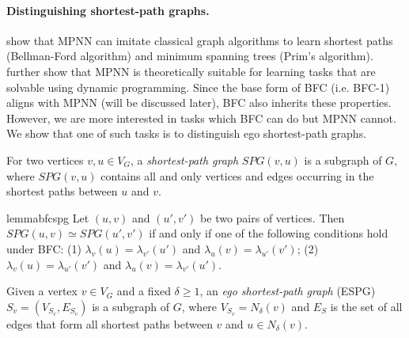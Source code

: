 
\paragraph{Distinguishing shortest-path graphs.} 
\citet{Velickovic_neuralexecutoin} show that MPNN can imitate classical graph algorithms to learn shortest paths (Bellman-Ford algorithm) and minimum spanning trees (Prim’s algorithm). \citet{xu20_gnnreasoning} further show that MPNN is theoretically suitable for learning tasks that are solvable using dynamic programming. Since the base form of BFC (i.e. BFC-1) aligns with MPNN (will be discussed later), BFC also inherits these properties. However, we are more interested in tasks which BFC can do but MPNN cannot. We show that one of such tasks is to distinguish ego shortest-path graphs. 

\begin{definition}
For two vertices $v, u\in V_G$, a \emph{shortest-path graph} $SPG(v,u)$ is a subgraph of $G$, where $SPG(v,u)$ contains all and only vertices and edges occurring in the shortest paths between $u$ and $v$.
\end{definition}

\begin{restatable}[]{lemma}{bfcspg}
\label{lemma:bfc2spg}
Let $(u,v)$ and $(u',v')$ be two pairs of vertices. Then $SPG(u,v)\simeq SPG(u',v')$ if and only if one of the following conditions hold under BFC: (1) $\lambda_v(u)= \lambda_{v'}(u')$ and $\lambda_u(v)= \lambda_{u'}(v')$; (2) $\lambda_v(u)= \lambda_{u'}(v')$ and $\lambda_u(v)= \lambda_{v'}(u')$.
\end{restatable}

\begin{definition}
Given a vertex $v\in V_G$ and a fixed $\delta \geq 1$, an \emph{ego shortest-path graph} (ESPG) $S_v = (V_{S_v}, E_{S_v})$ is a subgraph of $G$, where $V_{S_v} = N_{\delta}(v)$ and $E_S$ is the set of all edges that form all shortest paths between $v$ and $u\in N_{\delta}(v)$.
\end{definition}



